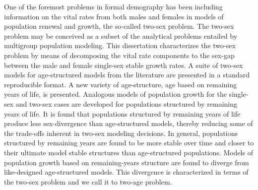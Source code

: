 
One of the foremost problems in formal demography has been including
information on the vital rates from both males and females in models of
population renewal and growth, the so-called two-sex problem. The two-sex
problem may be conceived as a subset of the analytical problems entailed by
multigroup population modeling. This dissertation characterizes the two-sex 
problem by means of decomposing the vital 
rate components to the sex-gap between the male and female single-sex stable growth
rates. A suite of two-sex models for age-structured models from the
literature are presented in a standard reproducible format. A new variety of
age-structure, age based on remaining years of life, is presented. Analogous 
models of population growth for the
single-sex and two-sex cases are developed for populations structured by
remaining years of life. It is found that populations structured by remaining
years of life produce less sex-divergence than age-structured models,
thereby reducing some of the trade-offs inherent in two-sex modeling decisions.
In general, populations structured by remaining years are found to be more
stable over time and closer to their ultimate model stable structures than
age-structured populations. Models of population growth based on remaining-years 
structure are found to diverge from like-designed age-structured models. This
divergence is characterized in terms of the two-sex problem and we call it to
two-age problem.
